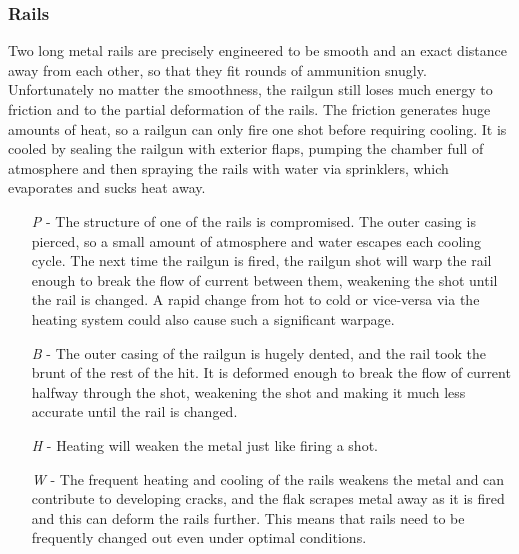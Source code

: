 \documentclass[a4paper]{article}
\begin{document}
\hspace{-18pt} \subsubsection{Rails} \label{railgun_rails} \vspace{-0.2cm}
Two long metal rails are precisely engineered to be smooth and an exact distance away from each other, so that they fit rounds of ammunition snugly. Unfortunately no matter the smoothness, the railgun still loses much energy to friction and to the partial deformation of the rails. The friction generates huge amounts of heat, so a railgun can only fire one shot before requiring cooling. It is cooled by sealing the railgun with exterior flaps, pumping the chamber full of atmosphere and then spraying the rails with water via sprinklers, which evaporates and sucks heat away.  
\begin{enumerate}
\item [\textit{P}] - The structure of one of the rails is compromised. The outer casing is pierced, so a small amount of atmosphere and water escapes each cooling cycle. 
\newline \hspace{-3pt} The next time the railgun is fired, the railgun shot will warp the rail enough to break the flow of current between them, weakening the shot until the rail is changed. A rapid change from hot to cold or vice-versa via the heating system could also cause such a significant warpage.
\item [\textit{B}] - The outer casing of the railgun is hugely dented, and the rail took the brunt of the rest of the hit. It is deformed enough to break the flow of current halfway through the shot, weakening the shot and making it much less accurate until the rail is changed.
\item [\textit{H}] - Heating will weaken the metal just like firing a shot.
\item [\textit{W}] - The frequent heating and cooling of the rails weakens the metal and can contribute to developing cracks, and the flak scrapes metal away as it is fired and this can deform the rails further. This means that rails need to be frequently changed out even under optimal conditions.
\end{enumerate}
\end{document}
